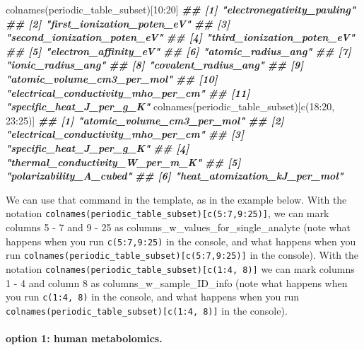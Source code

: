 \documentclass[
]{krantz}
\newenvironment{Shaded}{\begin{snugshade}}{\end{snugshade}}
\newcommand{\DecValTok}[1]{\textcolor[rgb]{0.00,0.00,0.81}{#1}}
\newcommand{\DocumentationTok}[1]{\textcolor[rgb]{0.56,0.35,0.01}{\textbf{\textit{#1}}}}
\newcommand{\FunctionTok}[1]{\textcolor[rgb]{0.00,0.00,0.00}{#1}}
\newcommand{\NormalTok}[1]{#1}
\newcommand{\SpecialCharTok}[1]{\textcolor[rgb]{0.00,0.00,0.00}{#1}}
\begin{document}
\begin{Shaded}
\begin{Highlighting}[]
\FunctionTok{colnames}\NormalTok{(periodic\_table\_subset)[}\DecValTok{10}\SpecialCharTok{:}\DecValTok{20}\NormalTok{]}
\DocumentationTok{\#\#  [1] "electronegativity\_pauling"         }
\DocumentationTok{\#\#  [2] "first\_ionization\_poten\_eV"         }
\DocumentationTok{\#\#  [3] "second\_ionization\_poten\_eV"        }
\DocumentationTok{\#\#  [4] "third\_ionization\_poten\_eV"         }
\DocumentationTok{\#\#  [5] "electron\_affinity\_eV"              }
\DocumentationTok{\#\#  [6] "atomic\_radius\_ang"                 }
\DocumentationTok{\#\#  [7] "ionic\_radius\_ang"                  }
\DocumentationTok{\#\#  [8] "covalent\_radius\_ang"               }
\DocumentationTok{\#\#  [9] "atomic\_volume\_cm3\_per\_mol"         }
\DocumentationTok{\#\# [10] "electrical\_conductivity\_mho\_per\_cm"}
\DocumentationTok{\#\# [11] "specific\_heat\_J\_per\_g\_K"}
\FunctionTok{colnames}\NormalTok{(periodic\_table\_subset)[}\FunctionTok{c}\NormalTok{(}\DecValTok{18}\SpecialCharTok{:}\DecValTok{20}\NormalTok{, }\DecValTok{23}\SpecialCharTok{:}\DecValTok{25}\NormalTok{)]}
\DocumentationTok{\#\# [1] "atomic\_volume\_cm3\_per\_mol"         }
\DocumentationTok{\#\# [2] "electrical\_conductivity\_mho\_per\_cm"}
\DocumentationTok{\#\# [3] "specific\_heat\_J\_per\_g\_K"           }
\DocumentationTok{\#\# [4] "thermal\_conductivity\_W\_per\_m\_K"    }
\DocumentationTok{\#\# [5] "polarizability\_A\_cubed"            }
\DocumentationTok{\#\# [6] "heat\_atomization\_kJ\_per\_mol"}
\end{Highlighting}
\end{Shaded}

We can use that command in the template, as in the example below. With the notation \texttt{colnames(periodic\_table\_subset){[}c(5:7,9:25){]}}, we can mark columns 5 - 7 and 9 - 25 as columns\_w\_values\_for\_single\_analyte (note what happens when you run \texttt{c(5:7,9:25)} in the console, and what happens when you run \texttt{colnames(periodic\_table\_subset){[}c(5:7,9:25){]}} in the console). With the notation \texttt{colnames(periodic\_table\_subset){[}c(1:4,\ 8){]}} we can mark columns 1 - 4 and column 8 as columns\_w\_sample\_ID\_info (note what happens when you run \texttt{c(1:4,\ 8)} in the console, and what happens when you run \texttt{colnames(periodic\_table\_subset){[}c(1:4,\ 8){]}} in the console).

\hypertarget{option-1-human-metabolomics.}{%
\paragraph{option 1: human metabolomics.}\label{option-1-human-metabolomics.}}
\end{document}
